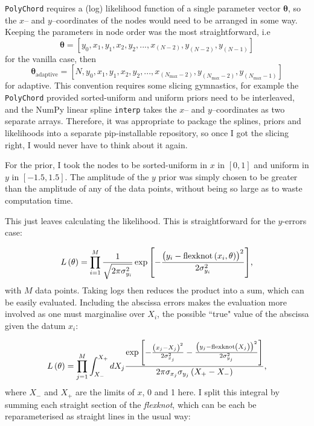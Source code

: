 \documentclass{article}
\begin{document}
\texttt{PolyChord} requires a (log) likelihood function of a single parameter vector $\mathbf{\theta}$, so the $x$-- and $y$--coordinates of the nodes would need to be arranged in some way. Keeping the parameters in node order was the most straightforward, i.e $$\bm\theta = [y_0, x_1, y_1, x_2, y_2, ..., x_{(N-2)}, y_{(N-2)}, y_{(N-1)}]$$for the vanilla case, then $$\bm\theta_\textrm{adaptive} = [N, y_0, x_1, y_1, x_2, y_2, ..., x_{(N_\textrm{max}-2)}, y_{(N_\textrm{max}-2)}, y_{(N_\textrm{max}-1)}]$$ for adaptive. This convention requires some slicing gymnastics, for example the \texttt{PolyChord} provided sorted-uniform and uniform priors need to be interleaved, and the NumPy linear spline \texttt{interp} takes the $x$-- and $y$--coordinates as two separate arrays. Therefore, it was appropriate to package the splines, priors and likelihoods into a separate pip-installable repository, so once I got the slicing right, I would never have to think about it again.

For the prior, I took the nodes to be sorted-uniform in $x$ in $\left[0, 1\right]$ and uniform in $y$ in $\left[-1.5, 1.5\right]$. The amplitude of the $y$ prior was simply chosen to be greater than the amplitude of any of the data points, without being so large as to waste computation time. 

This just leaves calculating the likelihood. This is straightforward for the $y$-errors case:

\begin{equation}
  L\left(\mathbf{\theta}\right) = \prod_{i=1}^{M}\frac{1}{\sqrt{2\pi\sigma_{y_i}^2}}\exp{\left[-\frac{\left(y_i-\textrm{flexknot}\left(x_i, \mathbf{\theta}\right)\right)^2}{2\sigma_{y_i}^2}\right]}\textrm,
\end{equation}
%
with $M$ data points. Taking logs then reduces the product into a sum, which can be easily evaluated. Including the abscissa errors makes the evaluation more involved as one must marginalise over $X_i$, the possible ``true" value of the abscissa given the datum $x_i$: 

\begin{equation}
  L\left(\mathbf{\theta}\right)= \prod_{j=1}^{M}\int_{X_-}^{X_+}dX_j\frac{\exp{\left[-\frac{\left(x_j-X_j\right)^2}{2\sigma_{x_j}^2} -\frac{\left(y_j-\textrm{flexknot}\left(X_j\right)\right)^2}{2\sigma_{y_j}^2}\right]}}{2\pi\sigma_{x_j}\sigma_{y_j}\left(X_+-X_-\right)}\textrm,
\end{equation}
%
where $X_-$ and $X_+$ are the limits of $x$, 0 and 1 here. I split this integral by summing each straight section of the \textit{flexknot}, which can be each be reparameterised as straight lines in the usual way:
\end{document}
